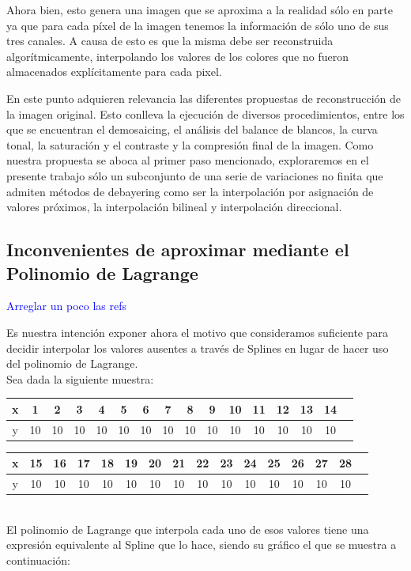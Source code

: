 \documentclass[a4paper]{article}
\begin{document}
Ahora bien, esto genera una imagen que se aproxima a la realidad sólo en parte ya que para cada p\'ixel de la imagen tenemos la informaci\'on de s\'olo uno de sus tres canales. A causa de esto es que la misma debe ser reconstruida algorítmicamente, interpolando los valores de los colores que no fueron almacenados explícitamente para cada pixel.


En este punto adquieren relevancia las diferentes propuestas de reconstrucción de la imagen original. Esto conlleva la ejecución de diversos procedimientos, entre los que se encuentran el demosaicing, el análisis del balance de blancos, la curva tonal, la saturación y el contraste y la compresión final de la imagen. Como nuestra propuesta se aboca al primer paso mencionado, exploraremos en el presente trabajo sólo un subconjunto de una serie de variaciones no finita que admiten métodos de debayering como ser la interpolación por asignación de valores próximos, la interpolación bilineal y interpolación direccional.\\

\newpage
\subsection{Inconvenientes de aproximar mediante el Polinomio de Lagrange}

\textcolor{blue}{Arreglar un poco las refs}

Es nuestra intención exponer ahora el motivo que consideramos suficiente para decidir interpolar los valores ausentes a través de Splines en lugar de hacer uso del polinomio de Lagrange.\\
Sea dada la siguiente muestra: \\
\smallskip


\begin{tabular}{ | c || c | c | c | c | c |c | c | c | c | c | c | c | c | c | c |}
 \hline                 
   x & 1 & 2 & 3 & 4 & 5 & 6 & 7 & 8 & 9 & 10 & 11 & 12 & 13 & 14 \\
 \hline    
y & 10 & 10 & 10& 10& 10& 10& 10& 10& 10& 10& 10& 10& 10& 10 \\
 \hline  
 \end{tabular}

\smallskip

\begin{tabular}{  | c || c | c | c | c | c |c | c | c | c | c | c | c | c | c | c |}
 \hline                 
   x&15& 16 & 17 & 18 & 19 & 20 & 21 & 22 & 23 & 24 & 25 & 26 & 27 & 28\\
 \hline    
y & 10 & 10 & 10& 10& 10& 10& 10& 10& 10& 10& 10& 10& 10& 10 \\
 \hline  
 \end{tabular}
\bigskip
\\
El polinomio de Lagrange que interpola cada uno de esos valores tiene una expresión equivalente al Spline que lo hace, siendo su gráfico el que se muestra a continuación:
\smallskip
\end{document}
